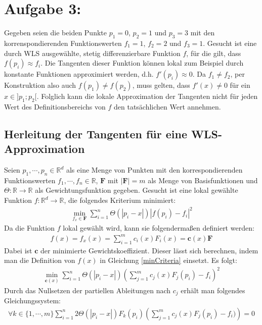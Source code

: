 \section*{Aufgabe 3: }
Gegeben seien die beiden Punkte $p_1 = 0$, $p_2 = 1$ und $p_3 = 3$ mit den korrenspondierenden Funktionswerten $f_1 = 1$, $f_2 = 2$ und $f_3 = 1$. Gesucht ist eine durch WLS ausgewählte, stetig differenzierbare Funktion $f$, für die gilt, dass $f(p_i) \approx f_i$. Die Tangenten dieser Funktion können lokal zum Beispiel durch konstante Funktionen approximiert werden, d.h. $f'(p_i) \approx 0$. Da $f_1 \neq f_2$, per Konstruktion also auch $f(p_1) \neq f(p_2)$, muss gelten, dass $f'(x) \neq 0$ für ein $x \in ]p_1; p_2[$. Folglich kann die lokale Approximation der Tangenten nicht für jeden Wert des Definitionsbereichs von $f$ den tatsächlichen Wert annehmen.
\subsection*{Herleitung der Tangenten für eine WLS-Approximation}
Seien $p_1,\cdots,p_n \in \mathbb{R}^d$ als eine Menge von Punkten mit den korrespondierenden Funktionswerten $f_1,\cdots,f_n \in \mathbb{R}$, $\bm{F}$ mit $|\bm{F}| = m$ als Menge von Basisfunktionen und $\Theta:\mathbb{R}\rightarrow\mathbb{R}$ als Gewichtungsfunktion gegeben. Gesucht ist eine lokal gewählte Funktion $f:\mathbb{R}^d\rightarrow\mathbb{R}$, die folgendes Kriterium minimiert:
\begin{align*}
  \min_{f_x \in \bm{F}}\sum_{i=1}^n\Theta(|p_i - x|)|f(p_i)-f_i|^2 \label{minCriteria}
\end{align*}
Da die Funktion $f$ lokal gewählt wird, kann sie folgendermaßen definiert werden:
\begin{align*}
  f(x) = f_x(x) = \sum_{i=1}^mc_i(x)F_i(x) = \bm{c}(x)\bm{F}
\end{align*}
Dabei ist $\bm{c}$ der minimierte Gewichtskoeffizient. Dieser lässt sich berechnen, indem man die Definition von $f(x)$ in Gleichung \ref{minCriteria} einsetzt. Es folgt:
\begin{align*}
  \min_{\bm{c}(x)}\sum_{i=1}^n\Theta(|p_i - x|)\left(\sum_{j=1}^mc_j(x)F_j(p_i) - f_i\right)^2
\end{align*}
Durch das Nullsetzen der partiellen Ableitungen nach $c_j$ erhält man folgendes Gleichungssystem:
\begin{align*}
  \forall k \in \{1,\cdots, m\} \sum_{i=1}^n2\Theta(|p_i - x|)F_k(p_i)\left(\sum_{j=1}^mc_j(x)F_j(p_i) - f_i)\right) = 0
\end{align*}
